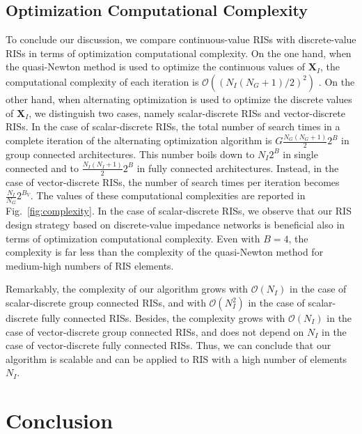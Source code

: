 \documentclass[twocolumn,10pt]{IEEEtran}
\begin{document}
\subsection{Optimization Computational Complexity}

To conclude our discussion, we compare continuous-value RISs with discrete-value RISs in terms of optimization computational complexity.
On the one hand, when the quasi-Newton method is used to optimize the continuous values of $\mathbf{X}_{I}$, the computational complexity of each iteration is $\mathcal{O}((N_{I}(N_{G}+1)/2)^2)$ \cite{she20}.
On the other hand, when alternating optimization is used to optimize the discrete values of $\mathbf{X}_{I}$, we distinguish two cases, namely scalar-discrete RISs and vector-discrete RISs.
In the case of scalar-discrete RISs, the total number of search times in a complete iteration of the alternating optimization algorithm is $G\frac{N_{G}\left(N_{G}+1\right)}{2}2^{B}$ in group connected architectures.
This number boils down to $N_I2^B$ in single connected and to $\frac{N_{I}\left(N_{I}+1\right)}{2}2^{B}$ in fully connected architectures.
Instead, in the case of vector-discrete RISs, the number of search times per iteration becomes $\frac{N_{I}}{N_{G}}2^{B_V}$.
The values of these computational complexities are reported in Fig.~\ref{fig:complexity}.
In the case of scalar-discrete RISs, we observe that our RIS design strategy based on discrete-value impedance networks is beneficial also in terms of optimization computational complexity.
Even with $B=4$, the complexity is far less than the complexity of the quasi-Newton method for medium-high numbers of RIS elements.

Remarkably, the complexity of our algorithm grows with $\mathcal{O}(N_I)$ in the case of scalar-discrete group connected RISs, and with $\mathcal{O}(N_I^2)$ in the case of scalar-discrete fully connected RISs.
Besides, the complexity grows with $\mathcal{O}(N_I)$ in the case of vector-discrete group connected RISs, and does not depend on $N_I$ in the case of vector-discrete fully connected RISs.
Thus, we can conclude that our algorithm is scalable and can be applied to RIS with a high number of elements $N_I$.

\section{Conclusion}
\label{sec:conclusion}
\end{document}

